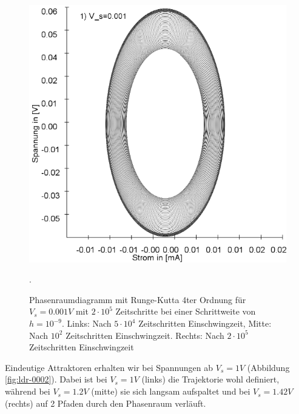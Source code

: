 \documentclass{scrartcl}
\begin{document}
\begin{figure}[!htbp]
\includegraphics[scale=0.28]{schwing-runge-nach200k-weitere200k-10-9}
\caption{Phasenraumdiagramm mit Runge-Kutta 4ter Ordnung für $V_s=0.001V$ mit $2\cdot10^5$ Zeitschritte bei einer Schrittweite von $h=10^{-9}$. Links: Nach $5\cdot10^4$ Zeitschritten Einschwingzeit, Mitte: Nach $10^2$ Zeitschritten Einschwingzeit. Rechts: Nach $2\cdot10^5$ Zeitschritten Einschwingzeit}. 
\label{fig:ldr-0001}
\end{figure}
Eindeutige Attraktoren erhalten wir bei Spannungen ab $V_s=1V$ (Abbildung \ref{fig:ldr-0002}). Dabei ist bei $V_s=1V$ (links) die Trajektorie wohl definiert, während bei $V_s=1.2V$ (mitte) sie sich langsam aufspaltet und bei $V_s=1.42V$ (rechts) auf 2 Pfaden durch den Phasenraum verläuft.
\end{document}
